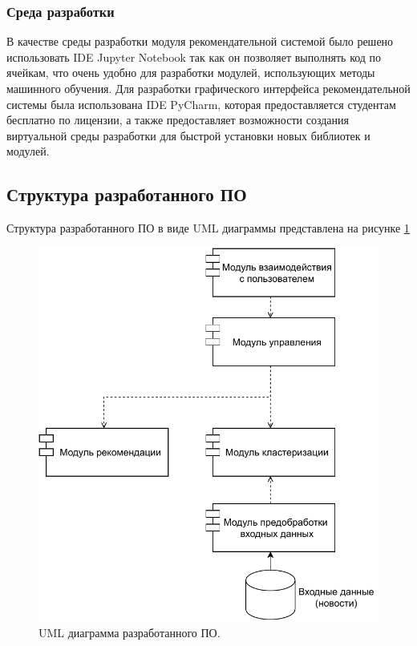 \subsubsection{Среда разработки}

В качестве среды разработки модуля рекомендательной системой было решено использовать IDE Jupyter Notebook так как он позволяет выполнять код по ячейкам, что очень удобно для разработки модулей, использующих методы машинного обучения. Для разработки графического интерфейса рекомендательной системы была использована IDE PyCharm, которая предоставляется студентам бесплатно по лицензии, а также предоставляет возможности создания виртуальной среды разработки для быстрой установки новых библиотек и модулей.

\subsection{Структура разработанного ПО}

Структура разработанного ПО в виде UML диаграммы представлена на рисунке \ref{uml}

\begin{figure}[H]
	\centering
	\includegraphics[width=\textwidth]{img/UML.pdf}
	\caption{UML диаграмма разработанного ПО.}
	\label{uml}
\end{figure}  

